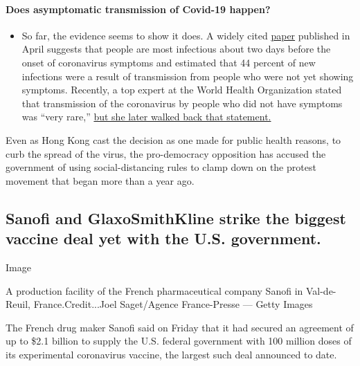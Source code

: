 \begin{itemize}
{  \paragraph{Does asymptomatic transmission of Covid-19
  happen?}\label{does-asymptomatic-transmission-of-covid-19-happen}}

  \begin{itemize}
  \tightlist
  \item
    So far, the evidence seems to show it does. A widely cited
    \href{https://www.nature.com/articles/s41591-020-0869-5}{paper}
    published in April suggests that people are most infectious about
    two days before the onset of coronavirus symptoms and estimated that
    44 percent of new infections were a result of transmission from
    people who were not yet showing symptoms. Recently, a top expert at
    the World Health Organization stated that transmission of the
    coronavirus by people who did not have symptoms was ``very rare,''
    \href{https://www.nytimes3xbfgragh.onion/2020/06/09/world/coronavirus-updates.html?action=click\&pgtype=Article\&state=default\&region=MAIN_CONTENT_3\&context=storylines_faq\#link-1f302e21}{but
    she later walked back that statement.}
  \end{itemize}
\end{itemize}

Even as Hong Kong cast the decision as one made for public health
reasons, to curb the spread of the virus, the pro-democracy opposition
has accused the government of using social-distancing rules to clamp
down on the protest movement that began more than a year ago.

\hypertarget{sanofi-and-glaxosmithkline-strike-the-biggest-vaccine-deal-yet-with-the-us-government}{%
\subsection{Sanofi and GlaxoSmithKline strike the biggest vaccine deal
yet with the U.S.
government.}\label{sanofi-and-glaxosmithkline-strike-the-biggest-vaccine-deal-yet-with-the-us-government}}

Image

A production facility of the French pharmaceutical company Sanofi in
Val-de-Reuil, France.Credit...Joel Saget/Agence France-Presse --- Getty
Images

The French drug maker Sanofi said on Friday that it had secured an
agreement of up to \$2.1 billion to supply the U.S. federal government
with 100 million doses of its experimental coronavirus vaccine, the
largest such deal announced to date.

